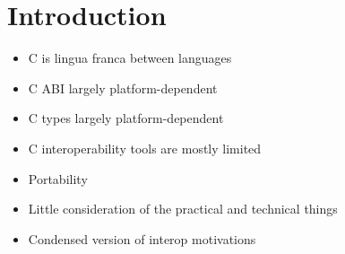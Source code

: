 \section{Introduction}
\begin{itemize}
    \item C is lingua franca between languages
    \item C ABI largely platform-dependent
    \item C types largely platform-dependent
    \item C interoperability tools are mostly limited
    \item Portability
    \item Little consideration of the practical and technical things
    \item Condensed version of interop motivations
\end{itemize}
